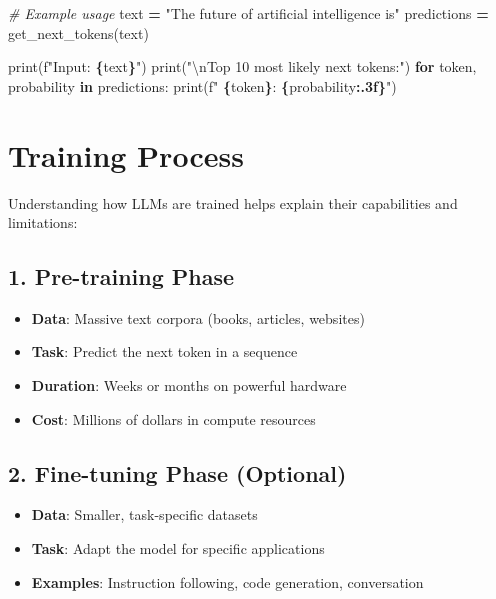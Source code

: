 \documentclass[
]{book}
\newenvironment{Shaded}{\begin{snugshade}}{\end{snugshade}}
\newcommand{\BuiltInTok}[1]{#1}
\newcommand{\CharTok}[1]{\textcolor[rgb]{0.31,0.60,0.02}{#1}}
\newcommand{\CommentTok}[1]{\textcolor[rgb]{0.56,0.35,0.01}{\textit{#1}}}
\newcommand{\ControlFlowTok}[1]{\textcolor[rgb]{0.13,0.29,0.53}{\textbf{#1}}}
\newcommand{\KeywordTok}[1]{\textcolor[rgb]{0.13,0.29,0.53}{\textbf{#1}}}
\newcommand{\NormalTok}[1]{#1}
\newcommand{\OperatorTok}[1]{\textcolor[rgb]{0.81,0.36,0.00}{\textbf{#1}}}
\newcommand{\SpecialCharTok}[1]{\textcolor[rgb]{0.81,0.36,0.00}{\textbf{#1}}}
\newcommand{\SpecialStringTok}[1]{\textcolor[rgb]{0.31,0.60,0.02}{#1}}
\newcommand{\StringTok}[1]{\textcolor[rgb]{0.31,0.60,0.02}{#1}}
\providecommand{\tightlist}{%
  \setlength{\itemsep}{0pt}\setlength{\parskip}{0pt}}
\begin{document}
\begin{Shaded}
\begin{Highlighting}[]
\CommentTok{\# Example usage}
\NormalTok{text }\OperatorTok{=} \StringTok{"The future of artificial intelligence is"}
\NormalTok{predictions }\OperatorTok{=}\NormalTok{ get\_next\_tokens(text)}

\BuiltInTok{print}\NormalTok{(}\SpecialStringTok{f"Input: \textquotesingle{}}\SpecialCharTok{\{}\NormalTok{text}\SpecialCharTok{\}}\SpecialStringTok{\textquotesingle{}"}\NormalTok{)}
\BuiltInTok{print}\NormalTok{(}\StringTok{"}\CharTok{\textbackslash{}n}\StringTok{Top 10 most likely next tokens:"}\NormalTok{)}
\ControlFlowTok{for}\NormalTok{ token, probability }\KeywordTok{in}\NormalTok{ predictions:}
    \BuiltInTok{print}\NormalTok{(}\SpecialStringTok{f"  \textquotesingle{}}\SpecialCharTok{\{}\NormalTok{token}\SpecialCharTok{\}}\SpecialStringTok{\textquotesingle{}: }\SpecialCharTok{\{}\NormalTok{probability}\SpecialCharTok{:.3f\}}\SpecialStringTok{"}\NormalTok{)}
\end{Highlighting}
\end{Shaded}

\section{Training Process}\label{training-process}

Understanding how LLMs are trained helps explain their capabilities and limitations:

\subsection{1. Pre-training Phase}\label{pre-training-phase}

\begin{itemize}
\tightlist
\item
  \textbf{Data}: Massive text corpora (books, articles, websites)
\item
  \textbf{Task}: Predict the next token in a sequence
\item
  \textbf{Duration}: Weeks or months on powerful hardware
\item
  \textbf{Cost}: Millions of dollars in compute resources
\end{itemize}

\subsection{2. Fine-tuning Phase (Optional)}\label{fine-tuning-phase-optional}

\begin{itemize}
\tightlist
\item
  \textbf{Data}: Smaller, task-specific datasets
\item
  \textbf{Task}: Adapt the model for specific applications
\item
  \textbf{Examples}: Instruction following, code generation, conversation
\end{itemize}
\end{document}
